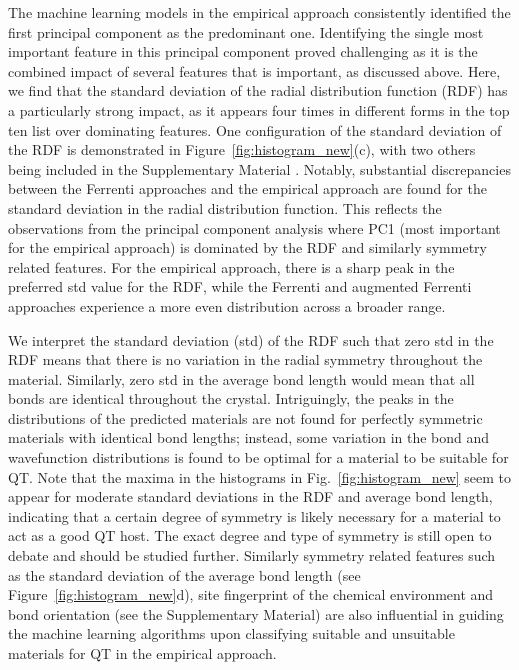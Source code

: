 \documentclass[superscriptaddress,unsortedaddress,
 amsmath,amssymb,
 aps,
]{revtex4-2}
\begin{document}
The machine learning models in the empirical approach consistently identified the first principal component as the predominant one. Identifying the single most important feature in this principal component proved challenging as it is the combined impact of several features that is important, as discussed above. 
Here, we find that the standard deviation of the radial distribution function (RDF) has a  particularly strong impact, as it appears four times in different forms in the top ten list over dominating features. One configuration of the standard deviation of the RDF is demonstrated in Figure~\ref{fig:histogram_new}(c), with two others being included in the Supplementary Material \cite{supplementary}. Notably, substantial discrepancies between the Ferrenti approaches and the empirical approach are found for the standard deviation in the radial distribution function. This reflects the observations from the principal component analysis where PC1 (most important for the empirical approach) is dominated by the RDF and similarly symmetry related features. For the empirical approach, there is a sharp peak in the preferred std value for the RDF, while the Ferrenti and augmented Ferrenti approaches experience a more even distribution across a broader range. 

We interpret the standard deviation (std) of the RDF such that zero std in the RDF means that there is no variation in the radial symmetry throughout the material. Similarly, zero std in the average bond length would mean that all bonds are identical throughout the crystal. Intriguingly, the peaks in the distributions of the predicted materials are not found for perfectly symmetric materials with identical bond lengths; instead, some variation in the bond and wavefunction distributions is found to be optimal for a material to be suitable for QT.  
Note that the maxima  in the histograms in Fig.~\ref{fig:histogram_new} seem to appear for moderate standard deviations in the RDF and average bond length, indicating that a certain degree of symmetry is likely necessary for a material to act as a good QT host. The exact degree and type of symmetry is still open to debate and should be studied further. 
Similarly symmetry related features such as the standard deviation of the average bond length (see Figure~\ref{fig:histogram_new}d), site fingerprint of the chemical environment and bond orientation (see the Supplementary Material) are also influential in guiding the machine learning algorithms upon classifying suitable and unsuitable materials for QT in the empirical approach. 
\end{document}
